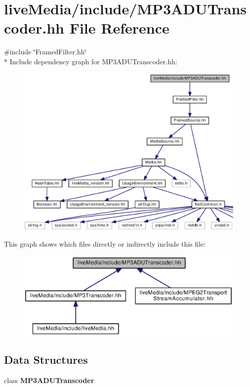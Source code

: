 \section{live\+Media/include/\+M\+P3\+A\+D\+U\+Transcoder.hh File Reference}
\label{MP3ADUTranscoder_8hh}
{\ttfamily \#include \char`\"{}Framed\+Filter.\+hh\char`\"{}}\\*
Include dependency graph for M\+P3\+A\+D\+U\+Transcoder.\+hh\+:
\nopagebreak
\begin{figure}[H]
\begin{center}
\leavevmode
\includegraphics[width=350pt]{MP3ADUTranscoder_8hh__incl}
\end{center}
\end{figure}
This graph shows which files directly or indirectly include this file\+:
\nopagebreak
\begin{figure}[H]
\begin{center}
\leavevmode
\includegraphics[width=350pt]{MP3ADUTranscoder_8hh__dep__incl}
\end{center}
\end{figure}
\subsection*{Data Structures}
\begin{DoxyCompactItemize}
\item 
class {\bf M\+P3\+A\+D\+U\+Transcoder}
\end{DoxyCompactItemize}
